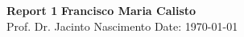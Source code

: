 \documentclass[a4paper, 11pt]{article}
\begin{document}
\noindent
\large\textbf{Report 1} \hfill \textbf{Francisco Maria Calisto} \\
\normalsize
Prof. Dr. Jacinto Nascimento \hfill Date: \today \\





\clearpage



\end{document}
